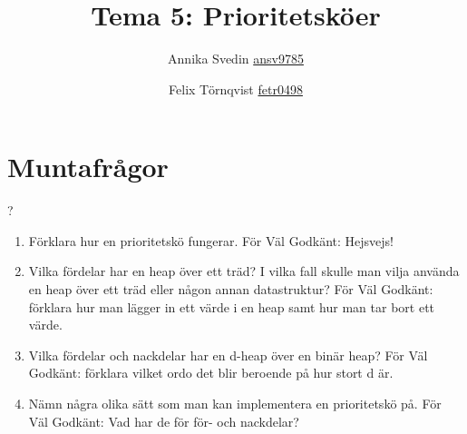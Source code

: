 \documentclass[a5paper,10pt,oneside]{article}
\title{Tema 5: Prioritetsköer}
\author{Annika Svedin \url{ansv9785} \and Felix Törnqvist \url{fetr0498}}
\begin{document}
\maketitle

\section*{Muntafrågor}
?
\begin{enumerate}
	\item Förklara hur en prioritetskö fungerar. För Väl Godkänt: Hejsvejs!
	\item Vilka fördelar har en heap över ett träd? I vilka fall skulle man vilja använda en heap över ett träd eller någon annan datastruktur? För Väl Godkänt: förklara hur man lägger in ett värde i en heap samt hur man tar bort ett värde.
	
	\item
	Vilka fördelar och nackdelar har en d-heap över en binär heap? För Väl Godkänt: förklara vilket ordo det blir beroende på hur stort d är.
	\item
	Nämn några olika sätt som man kan implementera en prioritetskö på. För Väl Godkänt: Vad har de för för- och nackdelar?
\end{enumerate}
\end{document}
